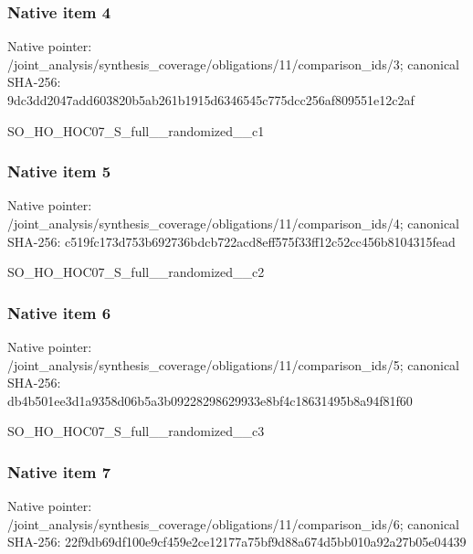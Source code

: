 \documentclass[10pt,a4paper]{article}
\begin{document}
\subsubsection{Native item 4}
Native pointer: /joint\_\allowbreak{}analysis/synthesis\_\allowbreak{}coverage/obligations/11/comparison\_\allowbreak{}ids/3; canonical SHA-256: 9dc3dd2047add603820b5ab261b1915d6346545c775dcc256af809551e12c2af

\begingroup\raggedright\sloppy SO\_\allowbreak{}HO\_\allowbreak{}HOC07\_\allowbreak{}S\_\allowbreak{}full\_\allowbreak{}\_\allowbreak{}randomized\_\allowbreak{}\_\allowbreak{}c1\par\endgroup

\subsubsection{Native item 5}
Native pointer: /joint\_\allowbreak{}analysis/synthesis\_\allowbreak{}coverage/obligations/11/comparison\_\allowbreak{}ids/4; canonical SHA-256: c519fc173d753b692736bdcb722acd8eff575f33ff12c52cc456b8104315fead

\begingroup\raggedright\sloppy SO\_\allowbreak{}HO\_\allowbreak{}HOC07\_\allowbreak{}S\_\allowbreak{}full\_\allowbreak{}\_\allowbreak{}randomized\_\allowbreak{}\_\allowbreak{}c2\par\endgroup

\subsubsection{Native item 6}
Native pointer: /joint\_\allowbreak{}analysis/synthesis\_\allowbreak{}coverage/obligations/11/comparison\_\allowbreak{}ids/5; canonical SHA-256: db4b501ee3d1a9358d06b5a3b09228298629933e8bf4c18631495b8a94f81f60

\begingroup\raggedright\sloppy SO\_\allowbreak{}HO\_\allowbreak{}HOC07\_\allowbreak{}S\_\allowbreak{}full\_\allowbreak{}\_\allowbreak{}randomized\_\allowbreak{}\_\allowbreak{}c3\par\endgroup

\subsubsection{Native item 7}
Native pointer: /joint\_\allowbreak{}analysis/synthesis\_\allowbreak{}coverage/obligations/11/comparison\_\allowbreak{}ids/6; canonical SHA-256: 22f9db69df100e9cf459e2ce12177a75bf9d88a674d5bb010a92a27b05e04439
\end{document}
